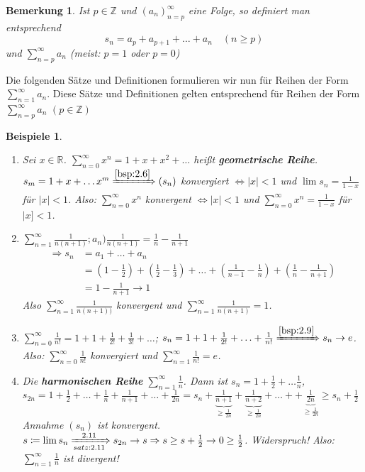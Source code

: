 \documentclass[titlepage,ngerman,a4paper,headsepline,DIV15,halfparskip*,14pt]{scrartcl}
\newcommand{\Z}{\mathbb{Z}}
\newcommand{\R}{\mathbb{R}}
\theoremstyle{dotless}
\newtheorem*{beispiele}{Beispiele}
\newtheorem*{bemerkung}{Bemerkung}
\begin{document}
\begin{bemerkung}
	Ist $p \in \Z$ und $(a_{n})_{n=p}^{\infty}$ eine Folge, so definiert man entsprechend
		$$ s_{n} = a_{p} + a_{p+1} + \dotsc + a_{n} \quad (n \geq p) $$
	und $\sum_{n=p}^{\infty} a_{n}$ (meist: $p = 1$ oder $p = 0$)
\end{bemerkung}


Die folgenden Sätze und Definitionen formulieren wir nun für Reihen der Form $\sum_{n=1}^{\infty} a_{n}$. Diese Sätze und Definitionen gelten entsprechend für Reihen der Form $\sum_{n=p}^{\infty} a_{n}$ $(p \in \Z)$

 
\begin{beispiele} ~\
	\begin{enumerate}
		\item Sei $x \in \R$. $\sum_{n=0}^{\infty} x^{n} = 1 + x + x^{2} + \dotsc$ hei{\ss}t \textbf{geometrische Reihe}. \\
			$s_{m} = 1 + x + \dotsc x^{m} \xRightarrow[]{\ref{bsp:2.6}} (s_{n})$ konvergiert $\iff |x| < 1$ und $\lim s_{n} = \frac{1}{1 - x}$ für $|x| < 1$. Also: $\sum_{n=0}^{\infty} x^{n}$ konvergent $\iff |x| < 1$ und $\sum_{n=0}^{\infty} x^{n} = \frac{1}{1 - x}$ für $|x] < 1$.
		\item $\sum_{n=1}^{\infty} \frac{1}{n(n+1)}; a_{n} ) \frac{1}{n(n+1)} = \frac{1}{n} - \frac{1}{n+1}$
			\begin{align*}
				\Rightarrow s_{n} & = a_{1} + \dotsc + a_{n} \\
						& = (1 - \frac{1}{2}) + (\frac{1}{2} - \frac{1}{3}) + \dotsc + (\frac{1}{n-1} - \frac{1}{n}) + (\frac{1}{n} - \frac{1}{n+1}) \\
						& = 1 - \frac{1}{n+1} \rightarrow 1
			\end{align*}
			Also $\sum_{n=1}^{\infty} \frac{1}{n(n+1))}$ konvergent und $\sum_{n=1}^{\infty} \frac{1}{n(n+1)} = 1$.
		\item $\sum_{n=0}^{\infty} \frac{1}{n!} = 1 + 1 + \frac{1}{2!} + \frac{1}{3!} + \dotsc$; $s_{n} = 1 + 1 + \frac{1}{2!} + \dotsc + \frac{1}{n!} \xRightarrow[]{\ref{bsp:2.9}} s_{n} \rightarrow e$. \\
			Also: $\sum_{n = 0}^{\infty} \frac{1}{n!}$ konvergiert und $\sum_{n=1}^{\infty} \frac{1}{n!} = e$.
		\item Die \textbf{harmonischen Reihe} $\sum_{n=1}^{\infty} \frac{1}{n}$. Dann ist $s_{n} = 1 + \frac{1}{2} + \dotsc \frac{1}{n}$, \\
			$s_{2n} = 1 + \frac{1}{2} + \dotsc + \frac{1}{n} + \frac{1}{n+1} + \dotsc + \frac{1}{2n} = s_{n} + \underbrace{\frac{1}{n+1}}_{\geq \frac{1}{2n}} + \underbrace{\frac{1}{n+2}}_{\geq \frac{1}{2n}} + \dotsc + + \underbrace{\frac{1}{2n}}_{\geq \frac{1}{2n}} \geq s_{n} + \frac{1}{2}$ \\
			Annahme $(s_{n})$ ist konvergent. $s \coloneqq \lim s_{n} \xRightarrow[satz:2.11]{2.11} s_{2n} \rightarrow s \Rightarrow s \geq s + \frac{1}{2} \rightarrow 0 \geq \frac{1}{2}$. Widerspruch! Also: $\sum_{n=1}^{\infty} \frac{1}{n}$ ist divergent!
	\end{enumerate}	
\end{beispiele}
\end{document}

